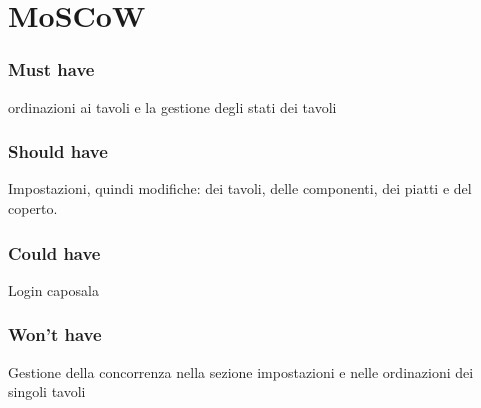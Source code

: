 \documentclass[12pt, letterpaper]{book}
\begin{document}
\section{MoSCoW}
\subsubsection{Must have}
ordinazioni ai tavoli e la gestione degli stati dei tavoli
\subsubsection{Should have}
Impostazioni, quindi modifiche: dei tavoli, delle componenti, dei piatti e del coperto.
\subsubsection{Could have}
Login caposala
\subsubsection{Won't have}
Gestione della concorrenza nella sezione impostazioni e nelle ordinazioni dei singoli tavoli

\end{document}

